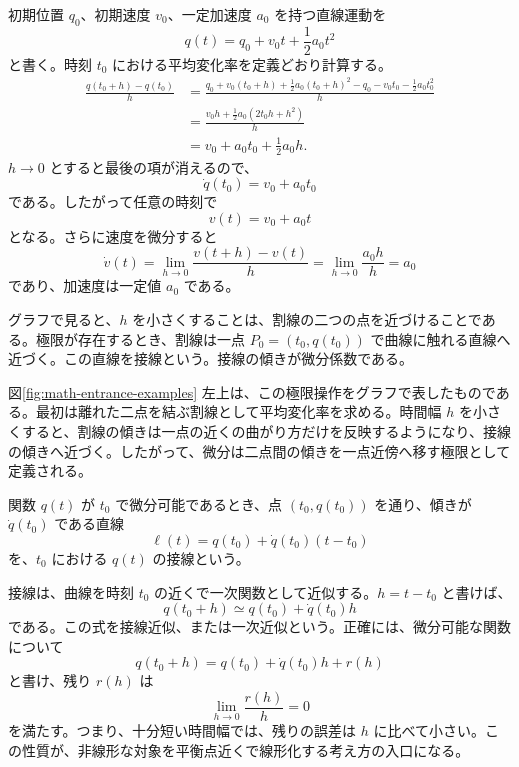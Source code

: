 \begin{example}[等加速度運動から速度を取り出す]
初期位置 $q_0$、初期速度 $v_0$、一定加速度 $a_0$ を持つ直線運動を
\begin{equation}
  q(t)=q_0+v_0t+\frac{1}{2}a_0t^2
\end{equation}
と書く。時刻 $t_0$ における平均変化率を定義どおり計算する。
\begin{align}
  \frac{q(t_0+h)-q(t_0)}{h}
  &=
    \frac{
      q_0+v_0(t_0+h)+\frac{1}{2}a_0(t_0+h)^2
      -q_0-v_0t_0-\frac{1}{2}a_0t_0^2
    }{h}\\
  &=
    \frac{
      v_0h+\frac{1}{2}a_0(2t_0h+h^2)
    }{h}\\
  &=v_0+a_0t_0+\frac{1}{2}a_0h.
\end{align}
$h\to0$ とすると最後の項が消えるので、
\begin{equation}
  \dot{q}(t_0)=v_0+a_0t_0
\end{equation}
である。したがって任意の時刻で
\begin{equation}
  v(t)=v_0+a_0t
\end{equation}
となる。さらに速度を微分すると
\begin{equation}
  \dot{v}(t)
  =\lim_{h\to0}\frac{v(t+h)-v(t)}{h}
  =\lim_{h\to0}\frac{a_0h}{h}
  =a_0
\end{equation}
であり、加速度は一定値 $a_0$ である。
\end{example}

グラフで見ると、$h$ を小さくすることは、割線の二つの点を近づけることである。極限が存在するとき、割線は一点 $P_0=(t_0,q(t_0))$ で曲線に触れる直線へ近づく。この直線を接線という。接線の傾きが微分係数である。

図\ref{fig:math-entrance-examples} 左上は、この極限操作をグラフで表したものである。最初は離れた二点を結ぶ割線として平均変化率を求める。時間幅 $h$ を小さくすると、割線の傾きは一点の近くの曲がり方だけを反映するようになり、接線の傾きへ近づく。したがって、微分は二点間の傾きを一点近傍へ移す極限として定義される。

\begin{definition}[接線]
関数 $q(t)$ が $t_0$ で微分可能であるとき、点 $(t_0,q(t_0))$ を通り、傾きが $\dot{q}(t_0)$ である直線
\begin{equation}
  \ell(t)=q(t_0)+\dot{q}(t_0)(t-t_0)
\end{equation}
を、$t_0$ における $q(t)$ の接線という。
\end{definition}

接線は、曲線を時刻 $t_0$ の近くで一次関数として近似する。$h=t-t_0$ と書けば、
\begin{equation}
  q(t_0+h)\simeq q(t_0)+\dot{q}(t_0)h
\end{equation}
である。この式を接線近似、または一次近似という。正確には、微分可能な関数について
\begin{equation}
  q(t_0+h)=q(t_0)+\dot{q}(t_0)h+r(h)
\end{equation}
と書け、残り $r(h)$ は
\begin{equation}
  \lim_{h\to0}\frac{r(h)}{h}=0
\end{equation}
を満たす。つまり、十分短い時間幅では、残りの誤差は $h$ に比べて小さい。この性質が、非線形な対象を平衡点近くで線形化する考え方の入口になる。

